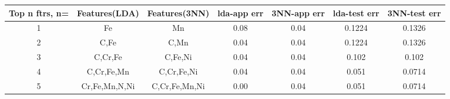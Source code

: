 \documentclass[paper=a4, fontsize=11pt]{scrartcl} %
\begin{document}


\begin{center}
 \begin{adjustwidth}{-1.5cm}{}
\small
\begin{tabular}{c c c c c c c}
\textbf{Top n ftrs, n=} \cellcolor{red!35} & \textbf{Features(LDA)} \cellcolor{red!35} & \textbf{Features(3NN)} \cellcolor{red!35} & \textbf{lda-app err} \cellcolor{red!35} & \textbf{3NN-app err} \cellcolor{red!35}& \textbf{lda-test err} \cellcolor{red!35}& \textbf{3NN-test err} \cellcolor{red!35} \\ [0.5cm]\hline \hline

1 \cellcolor{yellow!35} & Fe \cellcolor{yellow!35}& Mn \cellcolor{yellow!35} & 0.08 \cellcolor{yellow!35} & 0.04 \cellcolor{yellow!35}& 0.1224 \cellcolor{yellow!35}& 0.1326 \cellcolor{yellow!35} \\ [0.5cm]

2 \cellcolor{green!50} & C,Fe \cellcolor{green!50} & C,Mn \cellcolor{green!50}& 0.04 \cellcolor{green!50} & 0.04 \cellcolor{green!50}& 0.1224 \cellcolor{green!50}& 0.1326 \cellcolor{green!50} \\ [0.5cm]

3 \cellcolor{yellow!35} & C,Cr,Fe \cellcolor{yellow!35} & C,Fe,Ni \cellcolor{yellow!35} & 0.04 \cellcolor{yellow!35} & 0.04 \cellcolor{yellow!35}& 0.102 \cellcolor{yellow!35}& 0.102 \cellcolor{yellow!35} \\ [0.5cm]

4 \cellcolor{green!50} & C,Cr,Fe,Mn \cellcolor{green!50} & C,Cr,Fe,Ni \cellcolor{green!50}& 0.04 \cellcolor{green!50} & 0.04 \cellcolor{green!50}& 0.051 \cellcolor{green!50}& 0.0714 \cellcolor{green!50} \\ [0.5cm]

5 \cellcolor{yellow!35} & Cr,Fe,Mn,N,Ni \cellcolor{yellow!35} & C,Cr,Fe,Mn,Ni \cellcolor{yellow!35} & 0.00 \cellcolor{yellow!35} & 0.04 \cellcolor{yellow!35}& 0.051 \cellcolor{yellow!35}& 0.0714 \cellcolor{yellow!35} \\ [0.5cm]




\end{tabular}
\end{adjustwidth}
\end{center}
\end{document}

